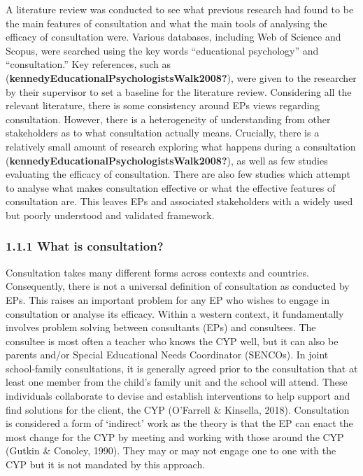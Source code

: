 \documentclass[
  english,
  man]{apa}
\begin{document}
A literature review was conducted to see what previous research had found to be the main features of consultation and what the main tools of analysing the efficacy of consultation were. Various databases, including Web of Science and Scopus, were searched using the key words ``educational psychology'' and ``consultation.'' Key references, such as (\textbf{kennedyEducationalPsychologistsWalk2008?}), were given to the researcher by their supervisor to set a baseline for the literature review. Considering all the relevant literature, there is some consistency around EPs views regarding consultation. However, there is a heterogeneity of understanding from other stakeholders as to what consultation actually means. Crucially, there is a relatively small amount of research exploring what happens during a consultation (\textbf{kennedyEducationalPsychologistsWalk2008?}), as well as few studies evaluating the efficacy of consultation. There are also few studies which attempt to analyse what makes consultation effective or what the effective features of consultation are. This leaves EPs and associated stakeholders with a widely used but poorly understood and validated framework.

\hypertarget{what-is-consultation}{%
\subsubsection{1.1.1 What is consultation?}\label{what-is-consultation}}

Consultation takes many different forms across contexts and countries. Consequently, there is not a universal definition of consultation as conducted by EPs. This raises an important problem for any EP who wishes to engage in consultation or analyse its efficacy. Within a western context, it fundamentally involves problem solving between consultants (EPs) and consultees. The consultee is most often a teacher who knows the CYP well, but it can also be parents and/or Special Educational Needs Coordinator (SENCOs). In joint school-family consultations, it is generally agreed prior to the consultation that at least one member from the child's family unit and the school will attend. These individuals collaborate to devise and establish interventions to help support and find solutions for the client, the CYP (O'Farrell \& Kinsella, 2018). Consultation is considered a form of `indirect' work as the theory is that the EP can enact the most change for the CYP by meeting and working with those around the CYP (Gutkin \& Conoley, 1990). They may or may not engage one to one with the CYP but it is not mandated by this approach.
\end{document}
